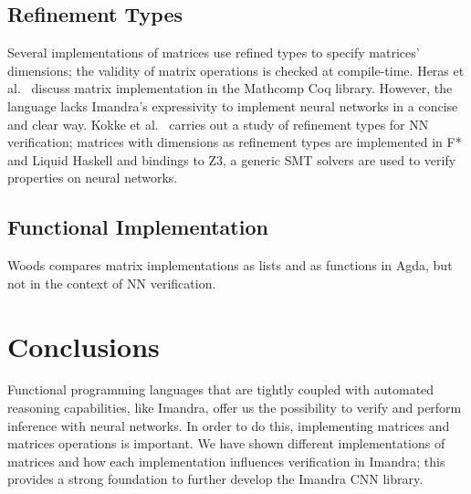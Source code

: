 \documentclass[runningheads]{llncs}
\begin{document}
\subsection{Refinement Types}
Several implementations of matrices use refined types to specify matrices' dimensions; the validity of matrix operations is checked at compile-time.
Heras et al.~\cite{heras_incidence_2011} discuss matrix implementation in the Mathcomp Coq library. However, the language lacks Imandra's expressivity to implement neural networks in a concise and clear way.
Kokke et al.~\cite{kokke_neural_2020} carries out a study of refinement types for NN verification; matrices with dimensions as refinement types are implemented in F* and Liquid Haskell and bindings to Z3, a generic SMT solvers are used to verify properties on neural networks.

\subsection{Functional Implementation}

Woods \cite{wood_vectors_2019} compares matrix implementations as lists and as functions in Agda, but not in the context of NN verification.
\fi


\section{Conclusions}
Functional programming languages that are tightly coupled with automated reasoning capabilities, like Imandra, offer us the possibility to verify and perform inference with neural networks. In order to do this, implementing matrices and matrices operations is important.
We have shown different implementations of matrices and how each implementation influences verification in Imandra; this provides a strong foundation to further develop the Imandra CNN library.


%
%


\end{document}
